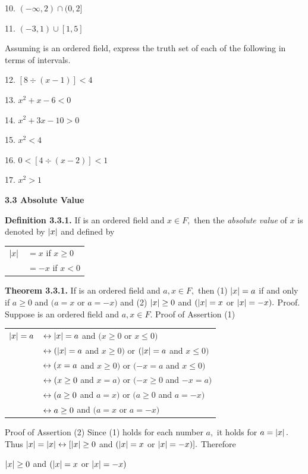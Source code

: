 \begin{large}
10. $(-\infty,2)\cap(0,2]$ \nl

11. $(-3,1)\cup[1,5]$ \nl


Assuming \of  is an ordered field, express the truth set of each of the following in terms of intervals. \nl

12. $[8\div(x-1)] < 4 $\nl

13. $x^{2} + x - 6 < 0 $\nl

14. $x^{2} + 3x - 10 > 0 $\nl

15. $x^{2} < 4 $\nl

16. $0 < [4\div (x-2)] < 1 $\nl

17. $x^{2} > 1 $\nl


\textbf{3.3 Absolute Value}\nl

\textbf{Definition 3.3.1.} If \of  is an ordered field and $x\in F,$ then the \textit{absolute value} of $x$ is denoted by $\left|x\right|$ and defined by \nl
\begin{tabular}{l l}
$\left|x\right|$ &$=x$ if $x\geq 0$\\
&$=-x$ if $x < 0$\\
\end{tabular}\nl

\textbf{Theorem 3.3.1.} If \of  is an ordered field and $a,x\in F,$ then\nl
(1) $\left|x\right| = a$ if and only if $a \geq 0$ and $(a = x$ or $a = -x)$ \nl
and\nl
(2) $\left|x\right| \geq 0$ and $( \left|x\right| = x$ or $\left|x\right| = -x).$\nl
Proof. Suppose \of is an ordered field and $a,x\in F$.\nl
Proof of Assertion (1)
\begin{tabular}{l l}
$\left|x\right|=a$& $\leftrightarrow \left|x\right|=a$ and $(x \geq 0$ or $x\leq 0)$\\
&$\leftrightarrow (\left|x\right| = a$ and $x\geq 0)$ or $(\left|x\right| = a$ and $x\leq 0) $\\
&$\leftrightarrow (x = a$ and $x\geq 0)$ or $(-x = a$ and $x\leq 0)$\\
&$\leftrightarrow  (x\geq 0$ and $x = a)$ or $(-x\geq 0$ and $-x = a)$\\
&$\leftrightarrow (a\geq 0$ and $a = x)$ or $(a \geq 0$ and $a = -x)$\\
&$\leftrightarrow a\geq 0$ and $(a = x$ or $a = -x)$\\
\end{tabular}\nl
Proof of Assertion (2)
Since (1) holds for each number $a,$ it holds for $a=\left|x\right|.$\nl
Thus $\left|x\right| = \left|x\right| \leftrightarrow  [\left|x\right| \geq 0$ and  $(\left|x\right| = x$ or $\left|x\right| = -x)].$ Therefore \nl

\newpage


$\left|x\right| \geq 0$ and $(\left|x\right| = x$ or $\left|x\right| = -x)$\nl


\end{large}
